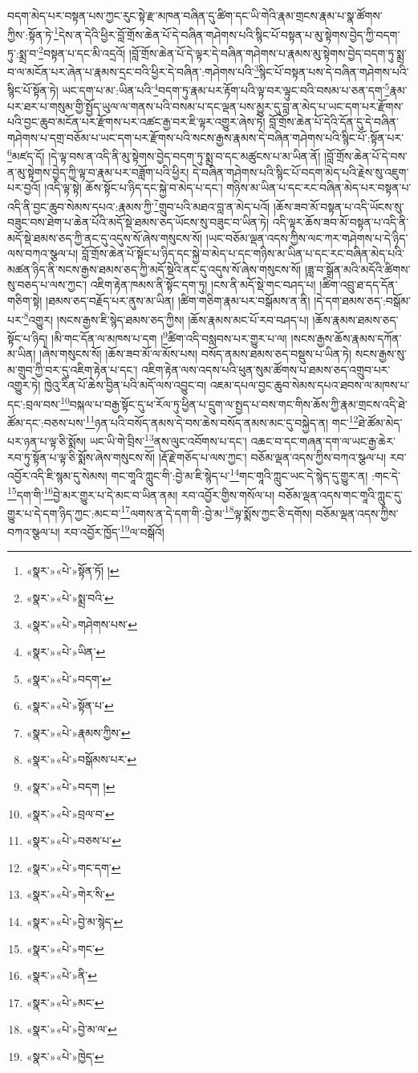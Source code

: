 བདག་མེད་པར་བསྟན་པས་ཀྱང་རུང་སྟེ་རྫ་མཁན་བཞིན་དུ་ཚིག་དང་ཡི་གེའི་རྣམ་གྲངས་རྣམ་པ་སྣ་ཚོགས་ཀྱིས་:སྟོན་ཏེ་\footnote{«སྣར་»«པེ་»སྟོན་ཏོ། །}དེས་ན་དེའི་ཕྱིར་བློ་གྲོས་ཆེན་པོ་དེ་བཞིན་གཤེགས་པའི་སྙིང་པོ་བསྟན་པ་མུ་སྟེགས་བྱེད་ཀྱི་བདག་ཏུ་:སྨྲ་བ་\footnote{«སྣར་»«པེ་»སྨྲ་བའི་}བསྟན་པ་དང་མི་འདྲའོ། །བློ་གྲོས་ཆེན་པོ་དེ་ལྟར་དེ་བཞིན་གཤེགས་པ་རྣམས་མུ་སྟེགས་བྱེད་བདག་ཏུ་སྨྲ་བ་ལ་མངོན་པར་ཞེན་པ་རྣམས་དྲང་བའི་ཕྱིར་དེ་བཞིན་:གཤེགས་པའི་\footnote{«སྣར་»«པེ་»གཤེགས་པས་}སྙིང་པོ་བསྟན་པས་དེ་བཞིན་གཤེགས་པའི་སྙིང་པོ་སྟོན་ཏེ། ཡང་དག་པ་མ་:ཡིན་པའི་\footnote{«སྣར་»«པེ་»ཡིན་}བདག་ཏུ་རྣམ་པར་རྟོག་པའི་ལྟ་བར་ལྟུང་བའི་བསམ་པ་ཅན་དག་\footnote{«སྣར་»«པེ་»བདག་}རྣམ་པར་ཐར་པ་གསུམ་གྱི་སྤྱོད་ཡུལ་ལ་གནས་པའི་བསམ་པ་དང་ལྡན་པས་མྱུར་དུ་བླ་ན་མེད་པ་ཡང་དག་པར་རྫོགས་པའི་བྱང་ཆུབ་མངོན་པར་རྫོགས་པར་འཚང་རྒྱ་བར་ཇི་ལྟར་འགྱུར་ཞེས་ཏེ། བློ་གྲོས་ཆེན་པོ་དེའི་དོན་དུ་དེ་བཞིན་གཤེགས་པ་དགྲ་བཅོམ་པ་ཡང་དག་པར་རྫོགས་པའི་སངས་རྒྱས་རྣམས་དེ་བཞིན་གཤེགས་པའི་སྙིང་པོ་:སྟོན་པར་\footnote{«སྣར་»«པེ་»སྟོན་པ་}མཛད་དོ། །དེ་ལྟ་བས་ན་འདི་ནི་མུ་སྟེགས་བྱེད་བདག་ཏུ་སྨྲ་བ་དང་མཚུངས་པ་མ་ཡིན་ནོ། །བློ་གྲོས་ཆེན་པོ་དེ་བས་ན་མུ་སྟེགས་བྱེད་ཀྱི་ལྟ་བ་རྣམ་པར་བཟློག་པའི་ཕྱིར། དེ་བཞིན་གཤེགས་པའི་སྙིང་པོ་བདག་མེད་པའི་རྗེས་སུ་འཇུག་པར་བྱའོ། །འདི་ལྟ་སྟེ། ཆོས་སྟོང་པ་ཉིད་དང་སྐྱེ་བ་མེད་པ་དང་། གཉིས་མ་ཡིན་པ་དང་རང་བཞིན་མེད་པར་བསྟན་པ་འདི་ནི་བྱང་ཆུབ་སེམས་དཔའ་:རྣམས་ཀྱི་\footnote{«སྣར་»«པེ་»རྣམས་ཀྱིས་}གྲུབ་པའི་མཐའ་བླ་ན་མེད་པའོ། །ཆོས་ཟབ་མོ་བསྟན་པ་འདི་ཡོངས་སུ་བཟུང་བས་ཐེག་པ་ཆེན་པོའི་མདོ་སྡེ་ཐམས་ཅད་ཡོངས་སུ་བཟུང་བ་ཡིན་ཏེ། འདི་ལྟར་ཆོས་ཟབ་མོ་བསྟན་པ་འདི་ནི་མདོ་སྡེ་ཐམས་ཅད་ཀྱི་ནང་དུ་འདུས་སོ་ཞེས་གསུངས་སོ། །ཡང་བཅོམ་ལྡན་འདས་ཀྱིས་ལང་ཀར་གཤེགས་པ་དེ་ཉིད་ལས་བཀའ་སྩལ་པ། བློ་གྲོས་ཆེན་པོ་སྟོང་པ་ཉིད་དང་སྐྱེ་བ་མེད་པ་དང་གཉིས་མ་ཡིན་པ་དང་རང་བཞིན་མེད་པའི་མཚན་ཉིད་ནི་སངས་རྒྱས་ཐམས་ཅད་ཀྱི་མདོ་སྡེའི་ནང་དུ་འདུས་སོ་ཞེས་གསུངས་སོ། །ཟླ་བ་སྒྲོན་མའི་མདོའི་ཚིགས་སུ་བཅད་པ་ལས་ཀྱང་། འཇིག་རྟེན་ཁམས་ནི་སྟོང་དག་ཏུ། །ངས་ནི་མདོ་སྡེ་གང་བཤད་པ། །ཚིག་འབྲུ་ཐ་དད་དོན་གཅིག་སྟེ། །ཐམས་ཅད་བརྗོད་པར་ནུས་མ་ཡིན། །ཚིག་གཅིག་རྣམ་པར་བསྒོམས་ན་ནི། །དེ་དག་ཐམས་ཅད་:བསྒོམ་པར་\footnote{«སྣར་»«པེ་»བསྒོམས་པར་}འགྱུར། །སངས་རྒྱས་ཇི་སྙེད་ཐམས་ཅད་ཀྱིས། །ཆོས་རྣམས་མང་པོ་རབ་བཤད་པ། །ཆོས་རྣམས་ཐམས་ཅད་སྟོང་པ་ཉིད། །མི་གང་དོན་ལ་མཁས་པ་དག །\footnote{«སྣར་»«པེ་»བདག །}ཚིག་འདི་བསླབས་པར་གྱུར་པ་ལ། །སངས་རྒྱས་ཆོས་རྣམས་དཀོན་མ་ཡིན། །ཞེས་གསུངས་སོ། །ཆོས་ཟབ་མོ་ལ་མོས་པས། བསོད་ནམས་ཐམས་ཅད་བསྡུས་པ་ཡིན་ཏེ། སངས་རྒྱས་སུ་མ་གྲུབ་ཀྱི་བར་དུ་འཇིག་རྟེན་པ་དང་། འཇིག་རྟེན་ལས་འདས་པའི་ཕུན་སུམ་ཚོགས་པ་ཐམས་ཅད་འགྲུབ་པར་འགྱུར་ཏེ། ཁྱེའུ་རིན་པོ་ཆེས་བྱིན་པའི་མདོ་ལས་འབྱུང་བ། འཇམ་དཔལ་བྱང་ཆུབ་སེམས་དཔའ་ཐབས་ལ་མཁས་པ་དང་:བྲལ་བས་\footnote{«སྣར་»«པེ་»བྲལ་བ་}བསྐལ་པ་བརྒྱ་སྟོང་དུ་ཕ་རོལ་ཏུ་ཕྱིན་པ་དྲུག་ལ་སྤྱད་པ་བས་གང་གིས་ཆོས་ཀྱི་རྣམ་གྲངས་འདི་ཐེ་ཚོམ་དང་:བཅས་པས་\footnote{«སྣར་»«པེ་»བཅས་པ་}ཉན་པའི་བསོད་ནམས་དེ་བས་ཆེས་བསོད་ནམས་མང་དུ་བསྐྱེད་ན། གང་\footnote{«སྣར་»«པེ་»གང་དག་}ཐེ་ཚོམ་མེད་པར་ཉན་པ་ལྟ་ཅི་སྨོས། ཡང་ཡི་གེ་བྲིས་\footnote{«སྣར་»«པེ་»གེར་ིས་}ནས་ལུང་འབོགས་པ་དང་། འཆང་བ་དང་གཞན་དག་ལ་ཡང་རྒྱ་ཆེར་རབ་ཏུ་སྟོན་པ་ལྟ་ཅི་སྨོས་ཞེས་གསུངས་སོ། །རྡོ་རྗེ་གཅོད་པ་ལས་ཀྱང་། བཅོམ་ལྡན་འདས་ཀྱིས་བཀའ་སྩལ་པ། རབ་འབྱོར་འདི་ཇི་སྙམ་དུ་སེམས། གང་གཱའི་ཀླུང་གི་:བྱེ་མ་ཇི་སྙེད་པ་\footnote{«སྣར་»«པེ་»བྱེ་མ་སྙེད་}གང་གཱའི་ཀླུང་ཡང་དེ་སྙེད་དུ་གྱུར་ན། :གང་དེ་\footnote{«སྣར་»«པེ་»གང་}དག་གི་\footnote{«སྣར་»«པེ་»ནི་}བྱེ་མར་གྱུར་པ་དེ་མང་བ་ཡིན་ནམ། རབ་འབྱོར་གྱིས་གསོལ་པ། བཅོམ་ལྡན་འདས་གང་གཱའི་ཀླུང་དུ་གྱུར་པ་དེ་དག་ཉིད་ཀྱང་:མང་བ་\footnote{«སྣར་»«པེ་»མང་}ལགས་ན་དེ་དག་གི་:བྱེ་མ་\footnote{«སྣར་»«པེ་»བྱེ་མ་ལ་}ལྟ་སྨོས་ཀྱང་ཅི་དགོས། བཅོམ་ལྡན་འདས་ཀྱིས་བཀའ་སྩལ་པ། རབ་འབྱོར་ཁྱོད་\footnote{«སྣར་»«པེ་»ཁྱེད་}ལ་བསྒོའོ། 